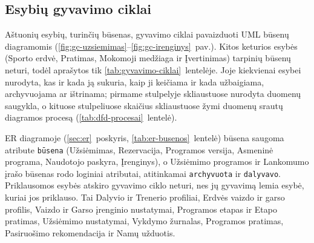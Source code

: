 

\subsection{Esybių gyvavimo ciklai}\label{sec:gyvavimo-ciklai}

Aštuonių esybių, turinčių būsenas, gyvavimo ciklai pavaizduoti UML būsenų
diagramomis (\ref{fig:gc-uzsiemimas}--\ref{fig:gc-irenginys}~pav.). Kitos
keturios esybės (Sporto erdvė, Pratimas, Mokomoji medžiaga ir Įvertinimas)
tarpinių būsenų neturi, todėl aprašytos tik \ref{tab:gyvavimo-ciklai}~lentelėje.
Joje kiekvienai esybei nurodyta, kas ir kada ją sukuria, kaip ji keičiama ir
kada užbaigiama, archyvuojama ar ištrinama; pirmame stulpelyje skliaustuose
nurodyta duomenų saugykla, o kituose stulpeliuose skaičius skliaustuose žymi
duomenų srautų diagramos procesą (\ref{tab:dfd-procesai}~lentelė).

ER diagramoje (\ref{sec:er}~poskyris, \ref{tab:er-busenos}~lentelė) būsena
saugoma atribute \texttt{būsena} (Užsiėmimas, Rezervacija, Programos versija,
Asmeninė programa, Naudotojo paskyra, Įrenginys), o Užsiėmimo programos ir
Lankomumo įrašo būsenas rodo loginiai atributai, atitinkamai
\texttt{archyvuota} ir \texttt{dalyvavo}. Priklausomos esybės atskiro
gyvavimo ciklo neturi, nes jų gyvavimą lemia esybė, kuriai jos priklauso. Tai
Dalyvio ir Trenerio profiliai, Erdvės vaizdo ir garso profilis, Vaizdo ir
Garso įrenginio nustatymai, Programos etapas ir Etapo pratimas, Užsiėmimo
nustatymai, Vykdymo žurnalas, Programos pratimas, Pasiruošimo rekomendacija ir
Namų užduotis.

